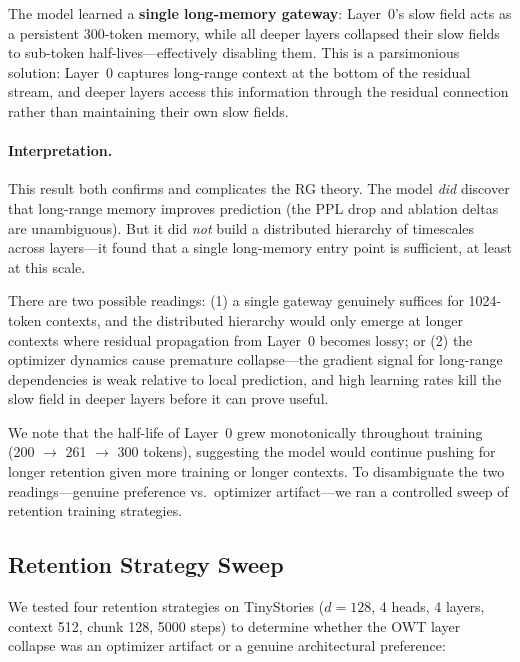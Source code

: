 \documentclass[11pt,a4paper]{article}
\begin{document}
The model learned a \textbf{single long-memory gateway}: Layer~0's
slow field acts as a persistent 300-token memory, while all deeper
layers collapsed their slow fields to sub-token half-lives---effectively
disabling them.  This is a parsimonious solution: Layer~0 captures
long-range context at the bottom of the residual stream, and deeper
layers access this information through the residual connection rather
than maintaining their own slow fields.

\paragraph{Interpretation.}  This result both confirms and
complicates the RG theory.  The model \emph{did} discover that
long-range memory improves prediction (the PPL drop and ablation
deltas are unambiguous).  But it did \emph{not} build a distributed
hierarchy of timescales across layers---it found that a single
long-memory entry point is sufficient, at least at this scale.

There are two possible readings: (1) a single gateway genuinely
suffices for 1024-token contexts, and the distributed hierarchy
would only emerge at longer contexts where residual propagation
from Layer~0 becomes lossy; or (2) the optimizer dynamics cause
premature collapse---the gradient signal for long-range dependencies
is weak relative to local prediction, and high learning rates kill
the slow field in deeper layers before it can prove useful.

We note that the half-life of Layer~0 grew monotonically throughout
training (200 $\to$ 261 $\to$ 300 tokens), suggesting the model
would continue pushing for longer retention given more training or
longer contexts.  To disambiguate the two readings---genuine
preference vs.\ optimizer artifact---we ran a controlled sweep of
retention training strategies.

\subsection{Retention Strategy Sweep}
\label{sec:retention-sweep}

We tested four retention strategies on TinyStories ($d = 128$,
4 heads, 4 layers, context 512, chunk 128, 5000 steps) to determine
whether the OWT layer collapse was an optimizer artifact or a genuine
architectural preference:
\end{document}
